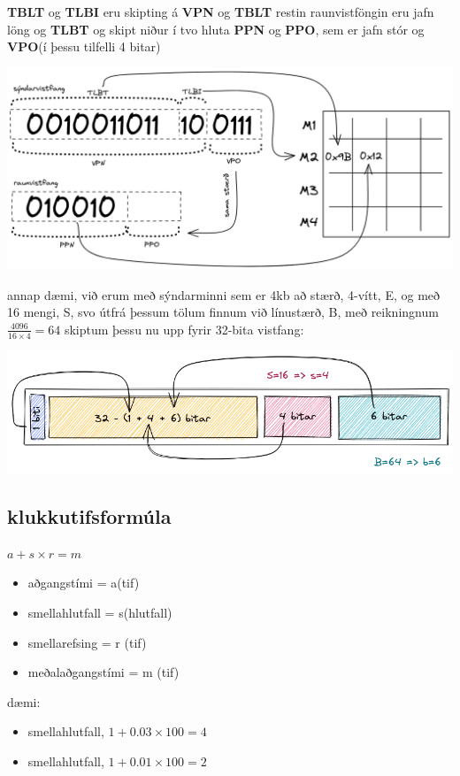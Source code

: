 \documentclass{article}
\begin{document}
\textbf{TBLT} og \textbf{TLBI} eru skipting á \textbf{VPN} og \textbf{TBLT} restin raunvistföngin eru jafn löng og \textbf{TLBT} og skipt niður í tvo hluta \textbf{PPN} og \textbf{PPO}, sem er jafn stór og \textbf{VPO}(í þessu tilfelli 4 bitar)

\includegraphics[scale = 0.2]{syndarminni.excalidraw.png}

annap dæmi, við erum með sýndarminni sem er 4kb að stærð, 4-vítt, E, og með 16 mengi, S, svo útfrá þessum tölum finnum við línustærð, B, með reikningnum $\frac{4096}{16 \times 4} = 64$ skiptum þessu nu upp fyrir 32-bita vistfang:

\includegraphics[scale = 0.3]{skipting.excalidraw.png}

\subsection{klukkutifsformúla}


$a + s \times r = m$
\begin{itemize}
    \item aðgangstími = a(tif)
    \item smellahlutfall = s(hlutfall)
    \item smellarefsing = r (tif)
    \item meðalaðgangstími = m (tif)
\end{itemize}

dæmi:
\begin{itemize}
    \item {} smellahlutfall, $1 + 0.03 \times 100 = 4$
    \item {} smellahlutfall, $1 + 0.01 \times 100 = 2$
\end{itemize}
\end{document}
